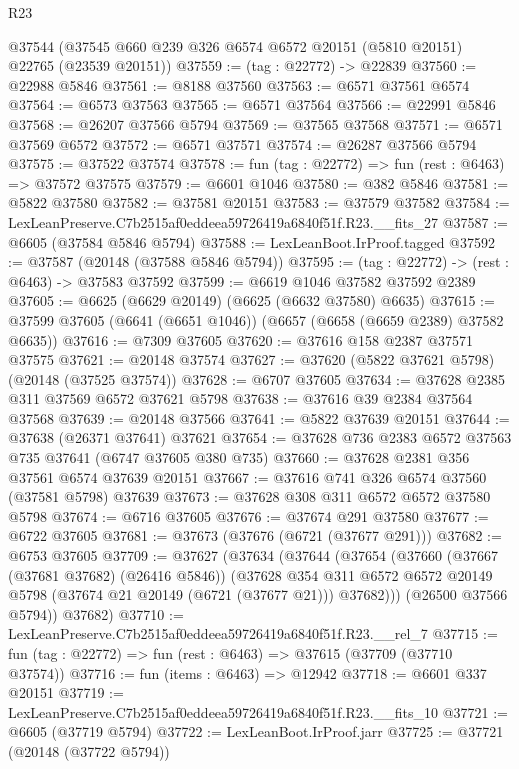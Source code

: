 \begin{lexlean}{R23}
\begin{coremodule}
  @37544 (@37545 @660 @239 @326 @6574 @6572 @20151 (@5810 @20151) @22765 (@23539 @20151))
@37559 := (tag : @22772) -> @22839
@37560 := @22988 @5846
@37561 := @8188 @37560
@37563 := @6571 @37561 @6574
@37564 := @6573 @37563
@37565 := @6571 @37564
@37566 := @22991 @5846
@37568 := @26207 @37566 @5794
@37569 := @37565 @37568
@37571 := @6571 @37569 @6572
@37572 := @6571 @37571
@37574 := @26287 @37566 @5794
@37575 := @37522 @37574
@37578 := fun (tag : @22772) => fun (rest : @6463) => @37572 @37575
@37579 := @6601 @1046
@37580 := @382 @5846
@37581 := @5822 @37580
@37582 := @37581 @20151
@37583 := @37579 @37582
@37584 := LexLeanPreserve.C7b2515af0eddeea59726419a6840f51f.R23.__fits_27
@37587 := @6605 (@37584 @5846 @5794)
@37588 := LexLeanBoot.IrProof.tagged
@37592 := @37587 (@20148 (@37588 @5846 @5794))
@37595 := (tag : @22772) -> (rest : @6463) -> @37583 @37592
@37599 := @6619 @1046 @37582 @37592 @2389
@37605 := @6625 (@6629 @20149) (@6625 (@6632 @37580) @6635)
@37615 := @37599 @37605 (@6641 (@6651 @1046)) (@6657 (@6658 (@6659 @2389) @37582 @6635))
@37616 := @7309 @37605
@37620 := @37616 @158 @2387 @37571 @37575
@37621 := @20148 @37574
@37627 := @37620 (@5822 @37621 @5798) (@20148 (@37525 @37574))
@37628 := @6707 @37605
@37634 := @37628 @2385 @311 @37569 @6572 @37621 @5798
@37638 := @37616 @39 @2384 @37564 @37568
@37639 := @20148 @37566
@37641 := @5822 @37639 @20151
@37644 := @37638 (@26371 @37641) @37621
@37654 := @37628 @736 @2383 @6572 @37563 @735 @37641 (@6747 @37605 @380 @735)
@37660 := @37628 @2381 @356 @37561 @6574 @37639 @20151
@37667 := @37616 @741 @326 @6574 @37560 (@37581 @5798) @37639
@37673 := @37628 @308 @311 @6572 @6572 @37580 @5798
@37674 := @6716 @37605
@37676 := @37674 @291 @37580
@37677 := @6722 @37605
@37681 := @37673 (@37676 (@6721 (@37677 @291)))
@37682 := @6753 @37605
@37709 := @37627
    (@37634
      (@37644
        (@37654
          (@37660
            (@37667 (@37681 @37682) (@26416 @5846))
            (@37628
              @354
              @311
              @6572
              @6572
              @20149
              @5798
              (@37674 @21 @20149 (@6721 (@37677 @21)))
              @37682)))
        (@26500 @37566 @5794))
      @37682)
@37710 := LexLeanPreserve.C7b2515af0eddeea59726419a6840f51f.R23.__rel_7
@37715 := fun (tag : @22772) => fun (rest : @6463) => @37615 (@37709 (@37710 @37574))
@37716 := fun (items : @6463) => @12942
@37718 := @6601 @337 @20151
@37719 := LexLeanPreserve.C7b2515af0eddeea59726419a6840f51f.R23.__fits_10
@37721 := @6605 (@37719 @5794)
@37722 := LexLeanBoot.IrProof.jarr
@37725 := @37721 (@20148 (@37722 @5794))

\end{coremodule}
\end{lexlean}
